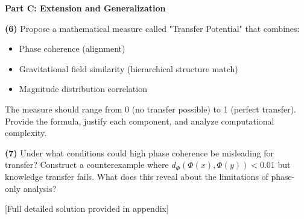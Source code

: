 \begin{critical}
\textbf{Part C: Extension and Generalization}

\textbf{(6)} Propose a mathematical measure called "Transfer Potential" that combines:
\begin{itemize}
\item Phase coherence (alignment)
\item Gravitational field similarity (hierarchical structure match)
\item Magnitude distribution correlation
\end{itemize}

The measure should range from 0 (no transfer possible) to 1 (perfect transfer). Provide the formula, justify each component, and analyze computational complexity.

\textbf{(7)} Under what conditions could high phase coherence be misleading for transfer? Construct a counterexample where $d_{\Phi}(\Phi(x), \Phi(y)) < 0.01$ but knowledge transfer fails. What does this reveal about the limitations of phase-only analysis?
\end{critical}

[Full detailed solution provided in appendix]




